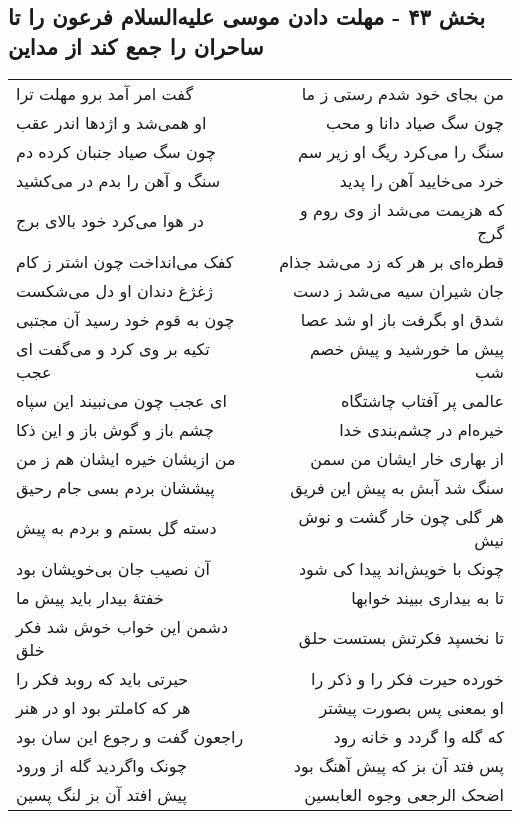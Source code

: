 \begin{center}
\section*{بخش ۴۳ - مهلت دادن موسی علیه‌السلام فرعون را  تا ساحران را جمع کند از مداین}
\label{sec:sh043}
\begin{longtable}{l p{0.5cm} r}
گفت امر آمد برو مهلت ترا
&&
من بجای خود شدم رستی ز ما
\\
او همی‌شد و اژدها اندر عقب
&&
چون سگ صیاد دانا و محب
\\
چون سگ صیاد جنبان کرده دم
&&
سنگ را می‌کرد ریگ او زیر سم
\\
سنگ و آهن را بدم در می‌کشید
&&
خرد می‌خایید آهن را پدید
\\
در هوا می‌کرد خود بالای برج
&&
که هزیمت می‌شد از وی روم و گرج
\\
کفک می‌انداخت چون اشتر ز کام
&&
قطره‌ای بر هر که زد می‌شد جذام
\\
ژغژغ دندان او دل می‌شکست
&&
جان شیران سیه می‌شد ز دست
\\
چون به قوم خود رسید آن مجتبی
&&
شدق او بگرفت باز او شد عصا
\\
تکیه بر وی کرد و می‌گفت ای عجب
&&
پیش ما خورشید و پیش خصم شب
\\
ای عجب چون می‌نبیند این سپاه
&&
عالمی پر آفتاب چاشتگاه
\\
چشم باز و گوش باز و این ذکا
&&
خیره‌ام در چشم‌بندی خدا
\\
من ازیشان خیره ایشان هم ز من
&&
از بهاری خار ایشان من سمن
\\
پیششان بردم بسی جام رحیق
&&
سنگ شد آبش به پیش این فریق
\\
دسته گل بستم و بردم به پیش
&&
هر گلی چون خار گشت و نوش نیش
\\
آن نصیب جان بی‌خویشان بود
&&
چونک با خویش‌اند پیدا کی شود
\\
خفتهٔ بیدار باید پیش ما
&&
تا به بیداری ببیند خوابها
\\
دشمن این خواب خوش شد فکر خلق
&&
تا نخسپد فکرتش بستست حلق
\\
حیرتی باید که روبد فکر را
&&
خورده حیرت فکر را و ذکر را
\\
هر که کاملتر بود او در هنر
&&
او بمعنی پس بصورت پیشتر
\\
راجعون گفت و رجوع این سان بود
&&
که گله وا گردد و خانه رود
\\
چونک واگردید گله از ورود
&&
پس فتد آن بز که پیش آهنگ بود
\\
پیش افتد آن بز لنگ پسین
&&
اضحک الرجعی وجوه العابسین
\\

\end{longtable}
\end{center}
